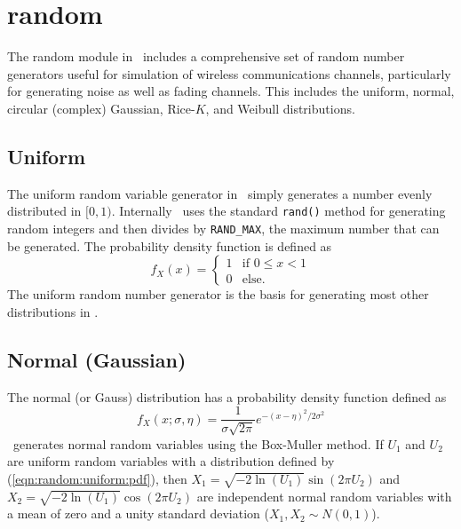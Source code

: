 % 
%

\newpage
\section{random}
\label{module:random}
The random module in \liquid\ includes a comprehensive set of
random number generators useful for simulation of wireless
communications channels,
particularly for generating noise as well as fading channels.
This includes the
uniform,
normal,
circular (complex) Gaussian,
Rice-$K$, and
Weibull distributions.


% 
%
\subsection{Uniform}
\label{module:random:uniform}
The uniform random variable generator in \liquid\ simply generates a
number evenly distributed in $[0,1)$.
Internally \liquid\ uses the standard {\tt rand()} method for generating
random integers and then divides by {\tt RAND\_MAX}, the maximum number
that can be generated.
The probability density function is defined as
%
\begin{equation}
\label{eqn:random:uniform:pdf}
    f_X(x) =
    \begin{cases}
        1 & \text{if $0 \leq x < 1$} \\
        0 & \text{else}.
    \end{cases}
\end{equation}
%
The uniform random number generator is the basis for generating most
other distributions in \liquid.

\subsection{Normal (Gaussian)}
\label{module:random:normal}
The normal (or Gauss) distribution has a probability density function
defined as
%
\begin{equation}
\label{eqn:random:normal:pdf}
    f_X(x;\sigma,\eta) =
        \frac{1}{\sigma \sqrt{2 \pi}}
        e^{-\left(x-\eta\right)^2/{2\sigma^2}}
\end{equation}
%
\liquid\ generates normal random variables using the Box-Muller method.
If $U_1$ and $U_2$ are uniform random variables with a distribution
defined by (\ref{eqn:random:uniform:pdf}), then
$X_1 = \sqrt{-2\ln(U_1)} \sin\left(2 \pi U_2\right)$ and
$X_2 = \sqrt{-2\ln(U_1)} \cos\left(2 \pi U_2\right)$
are independent normal random variables with a mean of zero and a unity
standard deviation ($X_1, X_2 \sim N(0,1)$).

